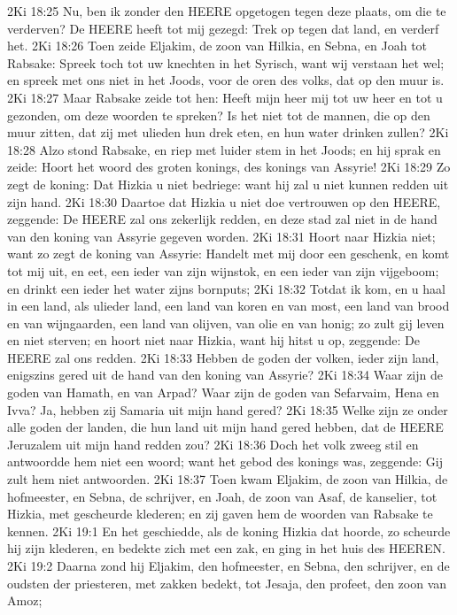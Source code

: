 2Ki 18:25  Nu, ben ik zonder den HEERE opgetogen tegen deze plaats, om die te verderven? De HEERE heeft tot mij gezegd: Trek op tegen dat land, en verderf het.
2Ki 18:26  Toen zeide Eljakim, de zoon van Hilkia, en Sebna, en Joah tot Rabsake: Spreek toch tot uw knechten in het Syrisch, want wij verstaan het wel; en spreek met ons niet in het Joods, voor de oren des volks, dat op den muur is.
2Ki 18:27  Maar Rabsake zeide tot hen: Heeft mijn heer mij tot uw heer en tot u gezonden, om deze woorden te spreken? Is het niet tot de mannen, die op den muur zitten, dat zij met ulieden hun drek eten, en hun water drinken zullen?
2Ki 18:28  Alzo stond Rabsake, en riep met luider stem in het Joods; en hij sprak en zeide: Hoort het woord des groten konings, des konings van Assyrie!
2Ki 18:29  Zo zegt de koning: Dat Hizkia u niet bedriege: want hij zal u niet kunnen redden uit zijn hand.
2Ki 18:30  Daartoe dat Hizkia u niet doe vertrouwen op den HEERE, zeggende: De HEERE zal ons zekerlijk redden, en deze stad zal niet in de hand van den koning van Assyrie gegeven worden.
2Ki 18:31  Hoort naar Hizkia niet; want zo zegt de koning van Assyrie: Handelt met mij door een geschenk, en komt tot mij uit, en eet, een ieder van zijn wijnstok, en een ieder van zijn vijgeboom; en drinkt een ieder het water zijns bornputs;
2Ki 18:32  Totdat ik kom, en u haal in een land, als ulieder land, een land van koren en van most, een land van brood en van wijngaarden, een land van olijven, van olie en van honig; zo zult gij leven en niet sterven; en hoort niet naar Hizkia, want hij hitst u op, zeggende: De HEERE zal ons redden.
2Ki 18:33  Hebben de goden der volken, ieder zijn land, enigszins gered uit de hand van den koning van Assyrie?
2Ki 18:34  Waar zijn de goden van Hamath, en van Arpad? Waar zijn de goden van Sefarvaim, Hena en Ivva? Ja, hebben zij Samaria uit mijn hand gered?
2Ki 18:35  Welke zijn ze onder alle goden der landen, die hun land uit mijn hand gered hebben, dat de HEERE Jeruzalem uit mijn hand redden zou?
2Ki 18:36  Doch het volk zweeg stil en antwoordde hem niet een woord; want het gebod des konings was, zeggende: Gij zult hem niet antwoorden.
2Ki 18:37  Toen kwam Eljakim, de zoon van Hilkia, de hofmeester, en Sebna, de schrijver, en Joah, de zoon van Asaf, de kanselier, tot Hizkia, met gescheurde klederen; en zij gaven hem de woorden van Rabsake te kennen.
2Ki 19:1  En het geschiedde, als de koning Hizkia dat hoorde, zo scheurde hij zijn klederen, en bedekte zich met een zak, en ging in het huis des HEEREN.
2Ki 19:2  Daarna zond hij Eljakim, den hofmeester, en Sebna, den schrijver, en de oudsten der priesteren, met zakken bedekt, tot Jesaja, den profeet, den zoon van Amoz;
